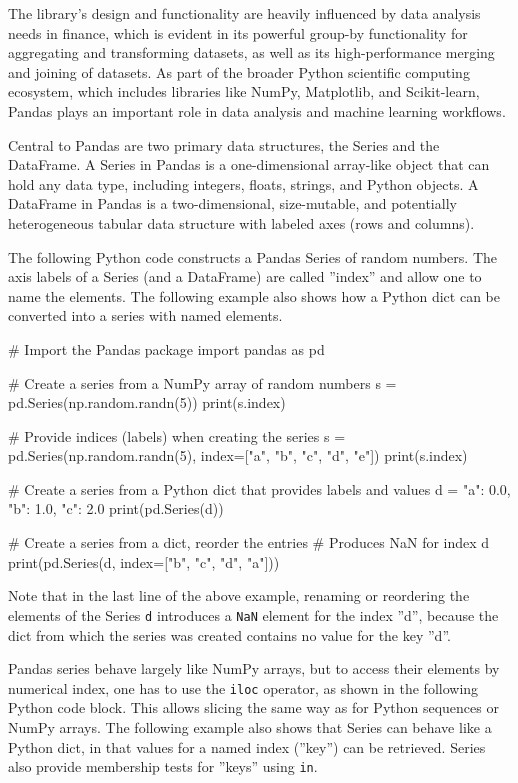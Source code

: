 The library's design and functionality are heavily influenced by data analysis needs in finance, which is evident in its powerful group-by functionality for aggregating and transforming datasets, as well as its high-performance merging and joining of datasets. As part of the broader Python scientific computing ecosystem, which includes libraries like NumPy, Matplotlib, and Scikit-learn, Pandas plays an important role in data analysis and machine learning workflows.

Central to Pandas are two primary data structures, the Series and the DataFrame. A Series in Pandas is a one-dimensional array-like object that can hold any data type, including integers, floats, strings, and Python objects. A DataFrame in Pandas is a two-dimensional, size-mutable, and potentially heterogeneous tabular data structure with labeled axes (rows and columns).

The following Python code constructs a Pandas Series of random numbers. The axis labels of a Series (and a DataFrame) are called ''index'' and allow one to name the elements. The following example also shows how a Python dict can be converted into a series with named elements.

\begin{pythoncode}
# Import the Pandas package
import pandas as pd

# Create a series from a NumPy array of random numbers
s = pd.Series(np.random.randn(5))
print(s.index)

# Provide indices (labels) when creating the series
s = pd.Series(np.random.randn(5), index=["a", "b", "c", "d", "e"])
print(s.index)

# Create a series from a Python dict that provides labels and values
d = {"a": 0.0, "b": 1.0, "c": 2.0}
print(pd.Series(d))

# Create a series from a dict, reorder the entries
# Produces NaN for index d
print(pd.Series(d, index=["b", "c", "d", "a"]))
\end{pythoncode}

Note that in the last line of the above example, renaming or reordering the elements of the Series \texttt{d} introduces a \texttt{NaN} element for the index ''d'', because the dict from which the series was created contains no value for the key ''d''.

Pandas series behave largely like NumPy arrays, but to access their elements by numerical index, one has to use the \texttt{iloc} operator, as shown in the following Python code block. This allows slicing the same way as for Python sequences or NumPy arrays. The following example also shows that Series can behave like a Python dict, in that values for a named index (''key'') can be retrieved. Series also provide membership tests for ''keys'' using \texttt{in}.

